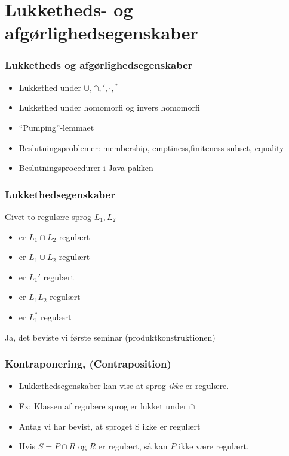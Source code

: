 \section{Lukketheds- og afgørlighedsegenskaber}

\begin{frame}
  \frametitle{Lukketheds og afgørlighedsegenskaber}
  \begin{itemize}
  \item Lukkethed under $\cup, \cap, ', \cdot, {}^*$ 
  \item Lukkethed under homomorfi og invers 
    homomorfi 
  \item ``Pumping''-lemmaet 
  \item Beslutningsproblemer: membership,  
    emptiness,finiteness subset, equality 
  \item Beslutningsprocedurer i Java-pakken
  \end{itemize}
\end{frame}

\begin{frame}
\frametitle{Lukkethedsegenskaber}
Givet to regulære sprog $L_1, L_2$
\begin{itemize}[<+->]
\item er $L_1 \cap L_2$ regulært
\item er $L_1 \cup L_2$ regulært
\item er $L_1'$ regulært
\item er $L_1L_2$ regulært
\item er $L_1^*$ regulært
\end{itemize}
Ja, det beviste vi første seminar (produktkonstruktionen)
\end{frame}

\begin{frame}
\frametitle{Kontraponering, (Contraposition)}
\begin{itemize}[<+->]
\item Lukkethedsegenskaber kan vise at sprog \emph{ikke} er regulære.
\item Fx: Klassen af regulære sprog er lukket under $\cap$
\item Antag vi har bevist, at sproget S ikke er  
regulært 
\item Hvis $S = P \cap R$ og $R$ er regulært, så kan  
$P$ ikke være regulært.
\end{itemize}
\end{frame}

